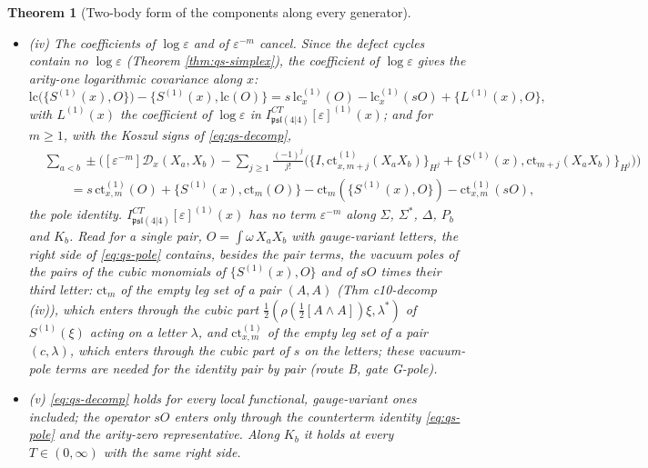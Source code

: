 \documentclass[11pt]{article}
\numberwithin{equation}{section}
\theoremstyle{plain}
\newtheorem{theorem}{Theorem}[section]
\theoremstyle{definition}
\begin{document}
\begin{theorem}[Two-body form of the components along every generator]
\begin{itemize}
\begin{equation}
\label{eq:qs-decomp}
\end{equation}
the two-body kernel $\Upsilon_x$ of Definition \ref{def:qs-defect} (iv) summed over the unordered pairs of letters, and a one-body term, the bracket with the arity-one finite counterterm along $x$, a derivation of the letters.
\item (iv) The coefficients of $\log\varepsilon$ and of $\varepsilon^{-m}$ cancel. Since the defect cycles contain no $\log\varepsilon$ (Theorem \ref{thm:qs-simplex}), the coefficient of $\log\varepsilon$ gives the arity-one logarithmic covariance along $x$:
\begin{equation}
\mathrm{lc}\big(\{S^{(1)}(x),O\}\big)-\big\{S^{(1)}(x),\mathrm{lc}(O)\big\}=s\,\mathrm{lc}^{(1)}_x(O)-\mathrm{lc}^{(1)}_x(sO)+\big\{L^{(1)}(x),O\big\},
\label{eq:qs-logcov}
\end{equation}
with $L^{(1)}(x)$ the coefficient of $\log\varepsilon$ in $I^{CT}_{\mathfrak{psl}(4|4)}[\varepsilon]^{(1)}(x)$; and for $m\ge1$, with the Koszul signs of \eqref{eq:qs-decomp},
\begin{equation}
\begin{aligned}
&\sum_{a<b}\pm\Big([\varepsilon^{-m}]\mathcal D_x(X_a,X_b)-\sum_{j\ge1}\tfrac{(-1)^j}{j!}\Big(\big\{I,\mathrm{ct}^{(1)}_{x,m+j}(X_aX_b)\big\}_{H^j}+\big\{S^{(1)}(x),\mathrm{ct}_{m+j}(X_aX_b)\big\}_{H^j}\Big)\Big)\\
&\qquad=s\,\mathrm{ct}^{(1)}_{x,m}(O)+\{S^{(1)}(x),\mathrm{ct}_m(O)\}-\mathrm{ct}_m(\{S^{(1)}(x),O\})-\mathrm{ct}^{(1)}_{x,m}(sO),
\end{aligned}
\label{eq:qs-pole}
\end{equation}
the pole identity. $I^{CT}_{\mathfrak{psl}(4|4)}[\varepsilon]^{(1)}(x)$ has no term $\varepsilon^{-m}$ along $\Sigma$, $\Sigma^*$, $\Delta$, $P_b$ and $K_b$. Read for a single pair, $O=\int\omega\,X_aX_b$ with gauge-variant letters, the right side of \eqref{eq:qs-pole} contains, besides the pair terms, the vacuum poles of the pairs of the cubic monomials of $\{S^{(1)}(x),O\}$ and of $sO$ times their third letter: $\mathrm{ct}_m$ of the empty leg set of a pair $(A,A)$ (Thm c10-decomp (iv)), which enters through the cubic part $\tfrac12(\rho(\tfrac12[A\wedge A])\xi,\lambda^*)$ of $S^{(1)}(\xi)$ acting on a letter $\lambda$, and $\mathrm{ct}^{(1)}_{x,m}$ of the empty leg set of a pair $(c,\lambda)$, which enters through the cubic part of $s$ on the letters; these vacuum-pole terms are needed for the identity pair by pair (route B, gate G-pole).
\item (v) \eqref{eq:qs-decomp} holds for every local functional, gauge-variant ones included; the operator $sO$ enters only through the counterterm identity \eqref{eq:qs-pole} and the arity-zero representative. Along $K_b$ it holds at every $T\in(0,\infty)$ with the same right side.
\end{itemize}
\end{theorem}
\end{document}

